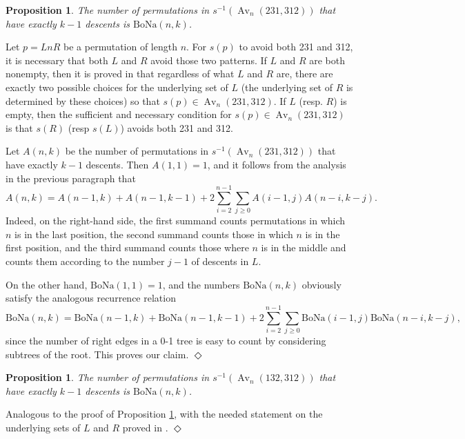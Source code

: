 \documentclass[11pt]{article}
\newcommand{\bona}{\mathrm{BoNa}}
\newcommand{\av}{\operatorname{Av}}
\newcommand{\qed}{\mbox{$\Diamond$}\vspace{\baselineskip}}
\newtheorem{proposition}[theorem]{Proposition}
\newenvironment{proof}{\noindent {\bf Proof:}}{{\qed}}
\begin{document}
\begin{proposition} \label{first} The number of permutations in $s^{-1}(\av_n(231,312))$ that have exactly $k-1$ descents is $\bona(n,k)$. \end{proposition}
\begin{proof} Let $p=LnR$ be a permutation of length $n$. For $s(p)$ to avoid both 231 and 312, it is necessary that both $L$ and $R$ avoid those two patterns. 
If $L$ and $R$ are both nonempty, then it is proved in \cite{01trees} that regardless of what $L$ and $R$ are, there are exactly two possible choices for the underlying set
of $L$ (the underlying set of $R$ is determined by these choices) so that $s(p)\in \av_n(231,312)$. If $L$ (resp. $R$) is empty, then the sufficient and necessary condition for 
$s(p)\in \av_n(231,312)$ is that $s(R)$ (resp $s(L)$) avoids both 231 and 312.  

Let $A(n,k)$ be the number of permutations in $s^{-1}(\av_n(231,312))$ that have exactly $k-1$ descents. Then $A(1,1)=1$, and it follows from the analysis in the previous paragraph that
\begin{equation} \label{recurrence} A(n,k) = A(n-1,k)+A(n-1,k-1) +2 \sum_{i=2}^{n-1} \sum_{j\geq 0} A(i-1,j)A(n-i,k-j) .\end{equation}
Indeed, on the right-hand side, the first summand counts permutations in which $n$ is in the last position, the second summand counts those in which $n$ is in the 
first position, and the third summand counts those where $n$ is in the middle and counts them according to the number $j-1$ of descents in $L$. 

On the other hand, $\bona(1,1)=1$, and  the numbers $\bona(n,k)$ obviously satisfy the analogous recurrence relation 
\begin{equation} \label{rbecurrence} \bona(n,k) = \bona(n-1,k)+\bona(n-1,k-1) +2 \sum_{i=2}^{n-1} \sum_{j\geq 0} \bona(i-1,j)\bona(n-i,k-j) ,\end{equation}
since the number of right edges in a 0-1 tree is easy to count by considering subtrees of the root.
This proves our claim.
\end{proof}

\begin{proposition} \label{second} The number of permutations in $s^{-1}(\av_n(132,312))$ that have exactly $k-1$ descents is $\bona(n,k)$. \end{proposition}
\begin{proof} Analogous to the proof of Proposition \ref{first}, with the needed statement on the underlying sets of $L$ and $R$ proved in \cite{01trees}.
\end{proof}
\end{document}
